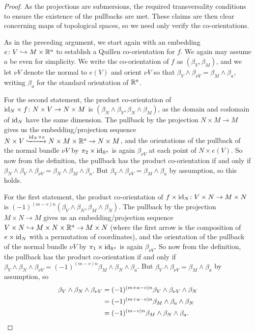 \begin{proof}
	As the projections are submersions, the required transversality conditions to ensure the existence of the pullbacks are met.
	These claims are then clear concerning maps of topological spaces, so we need only verify the co-orientations.

	As in the preceding argument, we start again with an embedding $e \colon V \hookrightarrow M \times \mathbb{R}^a$ to establish a Quillen co-orientation for $f$.
	We again may assume $a$ be even for simplicity.
	We write the co-orientation of $f$ as $(\beta_V,\beta_M)$, and we let $\nu V$ denote the normal to $e(V)$ and orient $\nu V$ so that $\beta_V \wedge \beta_{\nu V} = \beta_M \wedge \beta_a$, writing $\beta_a$ for the standard orientation of $\mathbb{R}^a$.

	For the second statement, the product co-orientation of $\mathrm{id}_N \times f \colon N \times V \to N \times M$ is $(\beta_N \wedge \beta_V,\beta_N \wedge \beta_M)$, as the domain and codomain of $\mathrm{id}_N$ have the same dimension.
	The pullback by the projection $N \times M \to M$ gives us the embedding/projection sequence $N \times V\xhookrightarrow{\mathrm{id}_N \times e} N \times M \times \mathbb{R}^a \to N \times M$, and the orientations of the pullback of the normal bundle $\nu V$ by $\pi_2 \times \mathrm{id}_{\mathbb{R}^a}$ is again $\beta_{\nu V}$ at each point of $N \times e(V)$.
	So now from the definition, the pullback has the product co-orientation if and only if $\beta_N \wedge \beta_V \wedge \beta_{\nu V} = \beta_N \wedge \beta_M \wedge \beta_a$.
	But $ \beta_V \wedge \beta_{\nu V} = \beta_M \wedge \beta_a$ by assumption, so this holds.

	For the first statement, the product co-orientation of $f \times \mathrm{id}_N \colon V \times N \to M \times N$ is $(-1)^{(m-v)n}(\beta_V \wedge \beta_N,\beta_M \wedge \beta_N)$.
	The pullback by the projection $M \times N \to M$ gives us an embedding/projection sequence $V \times N \hookrightarrow M \times N \times \mathbb{R}^a \to M \times N$ (where the first arrow is the composition of $e \times \mathrm{id}_N$ with a permutation of coordinates), and the orientation of the pullback of the normal bundle $\nu V$ by $\pi_1 \times \mathrm{id}_{\mathbb{R}^a}$ is again $\beta_{\nu V}$.
	So now from the definition, the pullback has the product co-orientation if and only if $\beta_V \wedge \beta_N \wedge \beta_{\nu V} = (-1)^{(m-v)n}\beta_M \wedge \beta_N \wedge \beta_a$.
	But $ \beta_V \wedge \beta_{\nu V} = \beta_M \wedge \beta_a$ by assumption, so
	\begin{align*}
		\beta_V \wedge \beta_N \wedge \beta_{\nu V}& = (-1)^{(m+a-v)n}\beta_V \wedge \beta_{\nu V} \wedge \beta_N\\
		& = (-1)^{(m+a-v)n}\beta_M \wedge \beta_a \wedge \beta_N\\
		& = (-1)^{(m-v)n}\beta_M \wedge \beta_N \wedge \beta_a.\qedhere
	\end{align*}
\end{proof}

